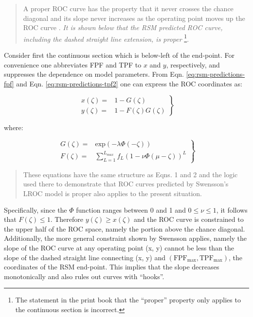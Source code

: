 \documentclass[
]{book}
\begin{document}
\begin{quote}
A proper ROC curve has the property that it never crosses the chance diagonal and its slope never increases as the operating point moves up the ROC curve \citep{metz1999proper, macmillan2004detection}. \emph{It is shown below that the RSM predicted ROC curve, including the dashed straight line extension, is proper} \footnote{The statement in the print book that the ``proper'' property only applies to the continuous section is incorrect.}.
\end{quote}

Consider first the continuous section which is below-left of the end-point. For convenience one abbreviates FPF and TPF to \(x\) and \(y\), respectively, and suppresses the dependence on model parameters. From Eqn. \eqref{eq:rsm-predictions-fpf} and Eqn. \eqref{eq:rsm-predictions-tpf2} one can express the ROC coordinates as:

\begin{equation}
\left. 
\begin{aligned}
x\left ( \zeta \right ) =& 1 - G\left ( \zeta \right )\\
y\left ( \zeta \right ) =& 1 - F\left ( \zeta \right ) G\left ( \zeta \right ) 
\end{aligned}
\right \}
\label{eq:rsm-predictions-f-g}
\end{equation}

where:

\begin{equation}
\left. 
\begin{aligned}
G\left ( \zeta \right ) =& \text{exp}\left ( -\lambda \Phi \left ( -\zeta \right )\right )\\
F\left ( \zeta \right ) =& \sum_{L=1}^{L_{max}} f_L  \left ( 1 - \nu \Phi \left ( \mu -\zeta \right ) \right )^L 
\end{aligned}
\right \}
\label{eq:rsm-predictions-fg-defs}
\end{equation}

\begin{quote}
These equations have the same structure as \citep{swensson1996unified} Eqns. 1 and 2 and the logic used there to demonstrate that ROC curves predicted by Swensson's LROC model is proper also applies to the present situation.
\end{quote}

Specifically, since the \(\Phi\) function ranges between 0 and 1 and \(0 \leq \nu \leq 1\), it follows that \(F\left ( \zeta \right ) \leq 1\). Therefore \(y\left ( \zeta \right ) \geq x\left ( \zeta \right )\) and the ROC curve is constrained to the upper half of the ROC space, namely the portion above the chance diagonal. Additionally, the more general constraint shown by Swensson applies, namely the slope of the ROC curve at any operating point (x, y) cannot be less than the slope of the dashed straight line connecting (x, y) and \(\left (\text{FPF}_{\text{max}}, \text{TPF}_{\text{max}} \right )\), the coordinates of the RSM end-point. This implies that the slope decreases monotonically and also rules out curves with ``hooks''.
\end{document}
